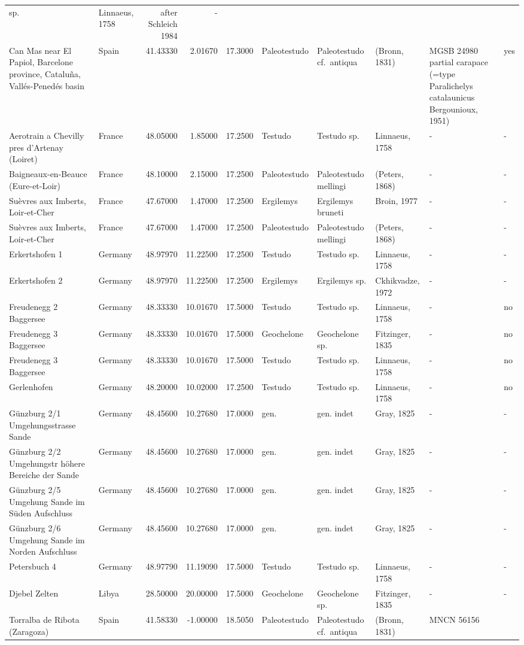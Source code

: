 \begin{landscape}
{\begin{longtable}[]{@{}llrrrlllll@{}}
sp. & Linnaeus, 1758 & after Schleich 1984 & -\tabularnewline
Can Mas near El Papiol, Barcelone province, Cataluña, Vallés-Penedés
basin & Spain & 41.43330 & 2.01670 & 17.3000 & Paleotestudo &
Paleotestudo cf.~antiqua & (Bronn, 1831) & MGSB 24980 partial carapace
(=type Paralichelys catalaunicus Bergounioux, 1951) & yes\tabularnewline
Aerotrain a Chevilly pres d'Artenay (Loiret) & France & 48.05000 &
1.85000 & 17.2500 & Testudo & Testudo sp. & Linnaeus, 1758 & - &
-\tabularnewline
Baigneaux-en-Beauce (Eure-et-Loir) & France & 48.10000 & 2.15000 &
17.2500 & Paleotestudo & Paleotestudo mellingi & (Peters, 1868) & - &
-\tabularnewline
Suèvres aux Imberts, Loir-et-Cher & France & 47.67000 & 1.47000 &
17.2500 & Ergilemys & Ergilemys bruneti & Broin, 1977 & - &
-\tabularnewline
Suèvres aux Imberts, Loir-et-Cher & France & 47.67000 & 1.47000 &
17.2500 & Paleotestudo & Paleotestudo mellingi & (Peters, 1868) & - &
-\tabularnewline
Erkertshofen 1 & Germany & 48.97970 & 11.22500 & 17.2500 & Testudo &
Testudo sp. & Linnaeus, 1758 & - & -\tabularnewline
Erkertshofen 2 & Germany & 48.97970 & 11.22500 & 17.2500 & Ergilemys &
Ergilemys sp. & Ckhikvadze, 1972 & - & -\tabularnewline
Freudenegg 2 Baggersee & Germany & 48.33330 & 10.01670 & 17.5000 &
Testudo & Testudo sp. & Linnaeus, 1758 & - & no\tabularnewline
Freudenegg 3 Baggersee & Germany & 48.33330 & 10.01670 & 17.5000 &
Geochelone & Geochelone sp. & Fitzinger, 1835 & - & no\tabularnewline
Freudenegg 3 Baggersee & Germany & 48.33330 & 10.01670 & 17.5000 &
Testudo & Testudo sp. & Linnaeus, 1758 & - & no\tabularnewline
Gerlenhofen & Germany & 48.20000 & 10.02000 & 17.2500 & Testudo &
Testudo sp. & Linnaeus, 1758 & - & no\tabularnewline
Günzburg 2/1 Umgehungsstrasse Sande & Germany & 48.45600 & 10.27680 &
17.0000 & gen. & gen. indet & Gray, 1825 & - & -\tabularnewline
Günzburg 2/2 Umgehungstr höhere Bereiche der Sande & Germany & 48.45600
& 10.27680 & 17.0000 & gen. & gen. indet & Gray, 1825 & - &
-\tabularnewline
Günzburg 2/5 Umgehung Sande im Süden Aufschluss & Germany & 48.45600 &
10.27680 & 17.0000 & gen. & gen. indet & Gray, 1825 & - &
-\tabularnewline
Günzburg 2/6 Umgehung Sande im Norden Aufschluss & Germany & 48.45600 &
10.27680 & 17.0000 & gen. & gen. indet & Gray, 1825 & - &
-\tabularnewline
Petersbuch 4 & Germany & 48.97790 & 11.19090 & 17.5000 & Testudo &
Testudo sp. & Linnaeus, 1758 & - & -\tabularnewline
Djebel Zelten & Libya & 28.50000 & 20.00000 & 17.5000 & Geochelone &
Geochelone sp. & Fitzinger, 1835 & - & -\tabularnewline
Torralba de Ribota (Zaragoza) & Spain & 41.58330 & -1.00000 & 18.5050 &
Paleotestudo & Paleotestudo cf.~antiqua & (Bronn, 1831) & MNCN 56156

\end{longtable}}
\end{landscape}
